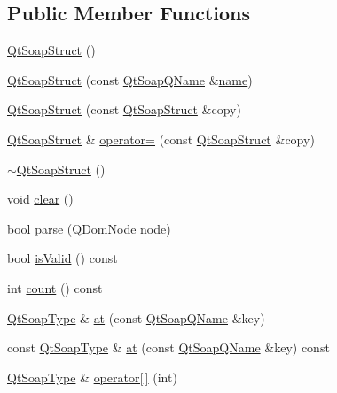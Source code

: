 \subsection*{Public Member Functions}
\begin{DoxyCompactItemize}
\item 
\mbox{\hyperlink{class_qt_soap_struct_a74de7963ddb745a2f3e179a1f1b90bbb}{Qt\+Soap\+Struct}} ()
\item 
\mbox{\hyperlink{class_qt_soap_struct_a70a767d39cf91f23936fb86ce4ec336c}{Qt\+Soap\+Struct}} (const \mbox{\hyperlink{class_qt_soap_q_name}{Qt\+Soap\+Q\+Name}} \&\mbox{\hyperlink{class_qt_soap_type_a6d5fb3d1ea4cf6d1432c7f62a5da09c3}{name}})
\item 
\mbox{\hyperlink{class_qt_soap_struct_a366fb6931d27c7f3cde07c00a3c40e05}{Qt\+Soap\+Struct}} (const \mbox{\hyperlink{class_qt_soap_struct}{Qt\+Soap\+Struct}} \&copy)
\item 
\mbox{\hyperlink{class_qt_soap_struct}{Qt\+Soap\+Struct}} \& \mbox{\hyperlink{class_qt_soap_struct_acf2ca608a693b3dc39d1e004632f4f3f}{operator=}} (const \mbox{\hyperlink{class_qt_soap_struct}{Qt\+Soap\+Struct}} \&copy)
\item 
\mbox{\hyperlink{class_qt_soap_struct_a3b8c2a12ec49a2f96cf90b053c186d73}{$\sim$\+Qt\+Soap\+Struct}} ()
\item 
void \mbox{\hyperlink{class_qt_soap_struct_a22f59c734dc676b9906e0d657052897f}{clear}} ()
\item 
bool \mbox{\hyperlink{class_qt_soap_struct_a995203c62315d9056d78cfe345b6b106}{parse}} (Q\+Dom\+Node node)
\item 
bool \mbox{\hyperlink{class_qt_soap_struct_a6331af5d1dc99b8ed528c26a834d961f}{is\+Valid}} () const
\item 
int \mbox{\hyperlink{class_qt_soap_struct_a3ae0552d2991d545b285e66bbaad560f}{count}} () const
\item 
\mbox{\hyperlink{class_qt_soap_type}{Qt\+Soap\+Type}} \& \mbox{\hyperlink{class_qt_soap_struct_a62d5abf450b25ec149779b0ac3e592ef}{at}} (const \mbox{\hyperlink{class_qt_soap_q_name}{Qt\+Soap\+Q\+Name}} \&key)
\item 
const \mbox{\hyperlink{class_qt_soap_type}{Qt\+Soap\+Type}} \& \mbox{\hyperlink{class_qt_soap_struct_a03c8b506cd61d2a7fe837058a3a8ce1b}{at}} (const \mbox{\hyperlink{class_qt_soap_q_name}{Qt\+Soap\+Q\+Name}} \&key) const
\item 
\mbox{\hyperlink{class_qt_soap_type}{Qt\+Soap\+Type}} \& \mbox{\hyperlink{class_qt_soap_struct_a7a17a5c0e57c9a0e1d8256970cebe1fe}{operator\mbox{[}$\,$\mbox{]}}} (int)

\end{DoxyCompactItemize}
